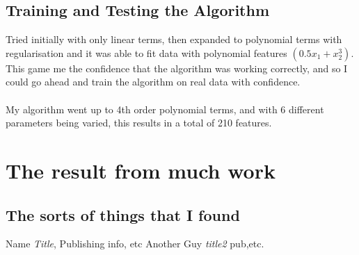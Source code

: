 \documentclass[a4paper,12pt]{report}
\begin{document}
\section{Training and Testing the Algorithm}

Tried initially with only linear terms, then expanded to polynomial terms with regularisation and it was able to fit data with polynomial features $(0.5x_1+x_2^3)$. This game me the confidence that the algorithm was working correctly, and so I could go ahead and train the algorithm on real data with confidence.\\\\
My algorithm went up to 4th order polynomial terms, and with 6 different parameters being varied, this results in a total of 210 features. 










\chapter{The result from much work}
\section{The sorts of things that I found}













\begin{thebibliography}{9}
    Name \emph{Title},
    Publishing info, etc
    Another Guy \emph{title2}
    pub,etc.






\end{thebibliography}
\end{document}
